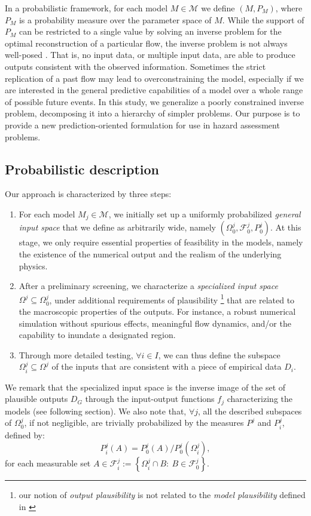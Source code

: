 \documentclass[nhess, manuscript]{copernicus}
\begin{document}
In a probabilistic framework, for each model $M\in\mathcal M$ we define $\left(M, P_{M}\right)$, where $P_M$ is a probability measure over the parameter space of $M$. While the support of $P_M$ can be restricted to a single value by solving an inverse problem for the optimal reconstruction of a particular flow, the inverse problem is not always well-posed \citep{Tarantola1982,  Tarantola1987}. That is, no input data, or multiple input data, are able to produce outputs consistent with the observed information. Sometimes the strict replication of a past flow may lead to overconstraining the model, especially if we are interested in the general predictive capabilities of a model over a whole range of possible future events. In this study, we  generalize a poorly constrained inverse problem, decomposing it into a hierarchy of simpler problems. Our purpose is to provide a new prediction-oriented formulation for use in hazard assessment problems.

\subsection{Probabilistic description}
Our approach is characterized by three steps:
\begin{enumerate}
\item For each model $M_j\in\mathcal M$, we initially set up a uniformly probabilized \emph{general input space} that we define as arbitrarily wide, namely $(\Omega^j_0,\mathcal F_0^j, P^j_0)$. At this stage, we only require essential properties of feasibility in the models, namely the existence of the numerical output and the realism of the underlying physics.
\item After a preliminary screening, we  characterize a \emph{specialized input space} $\Omega^j\subseteq\Omega^j_0$, under additional requirements of plausibility \footnote{our notion of \emph{output plausibility} is not related to the \emph{model plausibility} defined in \citep{Farrell2015}} that are related to the macroscopic properties of the outputs. For instance, a robust numerical simulation without spurious effects, meaningful flow dynamics, and/or the capability to inundate a designated region.
\item Through more detailed testing, $\forall i\in I$, we can thus define the subspace $\Omega^j_i\subseteq\Omega^j$ of the inputs that are consistent with a piece of empirical data $D_i$.
\end{enumerate}
We remark that the specialized input space is the inverse image of the set of plausible outputs $D_G$ through the input-output functions $f_j$ characterizing the models (see following section). We also note that, $\forall j$, all the described subspaces of $\Omega^j_0$, if not negligible, are trivially probabilized by the measures $P^j$ and $P^j_i$, defined by:
$$P_i^j(A)=P_0^j(A)/P^j_0(\Omega^j_i),$$
for each measurable set $A\in\mathcal F_i^j:=\left\{\Omega^j_i \cap B:\ B\in\mathcal F_0^j\right\}$.
\end{document}
